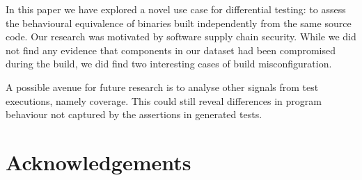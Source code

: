 \documentclass[conference]{IEEEtran}
\begin{document}
In this paper we have explored a novel use case for differential testing: to assess the behavioural equivalence of binaries built independently from the same source code. Our research was motivated by software supply chain security. While we did not find any evidence that components in our dataset had been compromised during the build, we did find two interesting cases of build misconfiguration.  

A possible avenue for future research is to analyse other signals from test executions, namely coverage. This could still reveal differences in program behaviour not captured by the assertions in generated tests. 

\section*{Acknowledgements}




\end{document}
